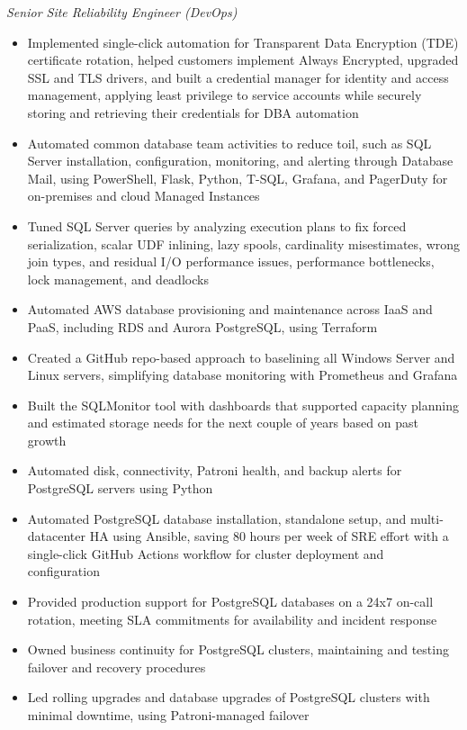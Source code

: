 \documentclass[10pt,a4paper]{article}
\begin{document}
\textit{Senior Site Reliability Engineer (DevOps)}\\[-5pt]
\begin{itemize}
  \item Implemented single-click automation for Transparent Data Encryption (TDE) certificate rotation, helped customers implement Always Encrypted, upgraded SSL and TLS drivers, and built a credential manager for identity and access management, applying least privilege to service accounts while securely storing and retrieving their credentials for DBA automation
  \item Automated common database team activities to reduce toil, such as SQL Server installation, configuration, monitoring, and alerting through Database Mail, using PowerShell, Flask, Python, T-SQL, Grafana, and PagerDuty for on-premises and cloud Managed Instances
  \item Tuned SQL Server queries by analyzing execution plans to fix forced serialization, scalar UDF inlining, lazy spools, cardinality misestimates, wrong join types, and residual I/O performance issues, performance bottlenecks, lock management, and deadlocks
  \item Automated AWS database provisioning and maintenance across IaaS and PaaS, including RDS and Aurora PostgreSQL, using Terraform
  \item Created a GitHub repo-based approach to baselining all Windows Server and Linux servers, simplifying database monitoring with Prometheus and Grafana
  \item Built the SQLMonitor tool with dashboards that supported capacity planning and estimated storage needs for the next couple of years based on past growth
  \item Automated disk, connectivity, Patroni health, and backup alerts for PostgreSQL servers using Python
  \item Automated PostgreSQL database installation, standalone setup, and multi-datacenter HA using Ansible, saving 80 hours per week of SRE effort with a single-click GitHub Actions workflow for cluster deployment and configuration
  \item Provided production support for PostgreSQL databases on a 24x7 on-call rotation, meeting SLA commitments for availability and incident response
  \item Owned business continuity for PostgreSQL clusters, maintaining and testing failover and recovery procedures
  \item Led rolling upgrades and database upgrades of PostgreSQL clusters with minimal downtime, using Patroni-managed failover

\end{itemize}
\end{document}
